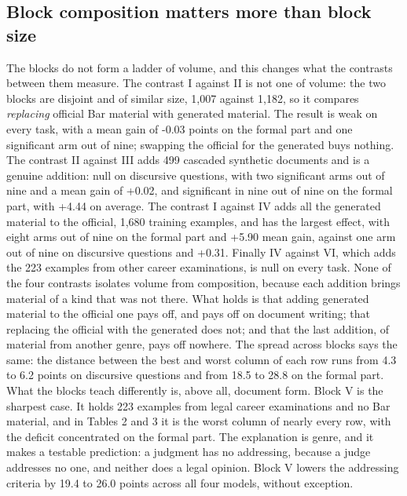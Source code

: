 \documentclass{IOS-Book-Article}
\begin{document}
\subsection{Block composition matters more than block size}
The blocks do not form a ladder of volume, and this changes what the contrasts between them measure. The contrast I against II is not one of volume: the two blocks are disjoint and of similar size, 1,007 against 1,182, so it compares \emph{replacing} official Bar material with generated material. The result is weak on every task, with a mean gain of -0.03 points on the formal part and one significant arm out of nine; swapping the official for the generated buys nothing. The contrast II against III adds 499 cascaded synthetic documents and is a genuine addition: null on discursive questions, with two significant arms out of nine and a mean gain of +0.02, and significant in nine out of nine on the formal part, with +4.44 on average. The contrast I against IV adds all the generated material to the official, 1,680 training examples, and has the largest effect, with eight arms out of nine on the formal part and +5.90 mean gain, against one arm out of nine on discursive questions and +0.31. Finally IV against VI, which adds the 223 examples from other career examinations, is null on every task.
None of the four contrasts isolates volume from composition, because each addition brings material of a kind that was not there. What holds is that adding generated material to the official one pays off, and pays off on document writing; that replacing the official with the generated does not; and that the last addition, of material from another genre, pays off nowhere. The spread across blocks says the same: the distance between the best and worst column of each row runs from 4.3 to 6.2 points on discursive questions and from 18.5 to 28.8 on the formal part. What the blocks teach differently is, above all, document form.
Block V is the sharpest case. It holds 223 examples from legal career examinations and no Bar material, and in Tables 2 and 3 it is the worst column of nearly every row, with the deficit concentrated on the formal part. The explanation is genre, and it makes a testable prediction: a judgment has no addressing, because a judge addresses no one, and neither does a legal opinion. Block V lowers the addressing criteria by 19.4 to 26.0 points across all four models, without exception.
\end{document}
